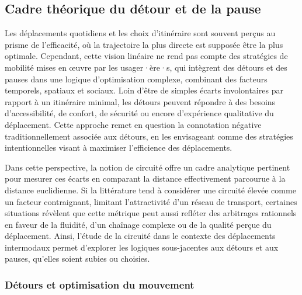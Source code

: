 \begin{refsegment}
\subsection{Cadre théorique du détour et de la pause
    \label{chap5:enjeux-detours-pauses}
    }

Les déplacements quotidiens et les choix d'itinéraire sont souvent perçus au prisme de l'efficacité, où la trajectoire la plus directe est supposée être la plus optimale. Cependant, cette vision linéaire ne rend pas compte des stratégies de mobilité mises en œuvre par les usager·ère·s, qui intègrent des détours et des pauses dans une logique d’optimisation complexe, combinant des facteurs temporels, spatiaux et sociaux. Loin d’être de simples écarts involontaires par rapport à un itinéraire minimal, les détours peuvent répondre à des besoins d’accessibilité, de confort, de sécurité ou encore d’expérience qualitative du déplacement. Cette approche remet en question la connotation négative traditionnellement associée aux détours, en les envisageant comme des stratégies intentionnelles visant à maximiser l’efficience des déplacements.%

Dans cette perspective, la notion de circuité offre un cadre analytique pertinent pour mesurer ces écarts en comparant la distance effectivement parcourue à la distance euclidienne. Si la littérature tend à considérer une circuité élevée comme un facteur contraignant, limitant l’attractivité d’un réseau de transport, certaines situations révèlent que cette métrique peut aussi refléter des arbitrages rationnels en faveur de la fluidité, d'un chaînage complexe ou de la qualité perçue du déplacement. Ainsi, l’étude de la circuité dans le contexte des déplacements intermodaux permet d’explorer les logiques sous-jacentes aux détours et aux pauses, qu’elles soient subies ou choisies.%

\subsubsection*{Détours et optimisation du mouvement
    \label{chap5:detours-optimisation}
    }


\end{refsegment}
